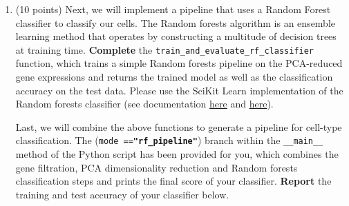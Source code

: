 \begin{enumerate}
\begin{solution}
\end{solution}

\item (10 points) Next, we will implement a pipeline that uses a Random Forest classifier to classify our cells. The Random forests algorithm is an ensemble learning method that operates by constructing a multitude of decision trees at training time.
 \textbf{Complete} the \texttt{train\_and\_evaluate\_rf\_classifier} function, which trains a simple Random forests pipeline on the PCA-reduced gene expressions and returns the trained model as well as the classification accuracy on the test data. Please use the SciKit Learn implementation of the Random forests classifier (see documentation \href{https://scikit-learn.org/stable/modules/generated/sklearn.ensemble.RandomForestClassifier.html}{here} and \href{https://scikit-learn.org/stable/modules/generated/sklearn.pipeline.Pipeline.html}{here}).

 Last, we will combine the above functions to generate a pipeline for cell-type classification. The (\texttt{mode ==\textbf{"rf\_pipeline"}}) branch within the \texttt{\_\_main\_\_} method of the Python script has been provided for you, which combines the gene filtration, PCA dimensionality reduction and Random forests classification steps and prints the final score of your classifier. \textbf{Report} the training and test accuracy of your classifier below.

\begin{solution}

\end{solution}
\end{enumerate}
